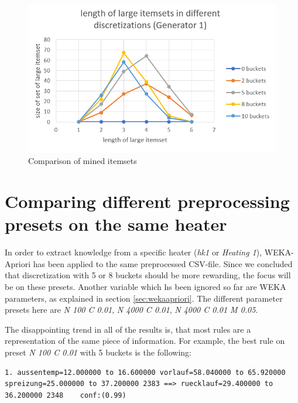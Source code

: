 \documentclass[bachelor,english]{info1thesis}
\begin{document}
\begin{figure}[htb]
	\begin{center}
		\includegraphics[scale=0.65]{abbildungen/itemsetssize.PNG}
		\caption{Comparison of mined itemsets}
			\label{fig:itemsetsizes}
	\end{center}
\end{figure}

\section{Comparing different preprocessing presets on the same heater}
\label{sec:sameheater}
In order to extract knowledge from a specific heater (\textit{hk1} or \textit{Heating 1}), WEKA-Apriori has been applied to the same preprocessed CSV-file. Since we concluded that discretization with 5 or 8 buckets should be more rewarding, the focus will be on these presets. Another variable which hs been ignored so far are WEKA parameters, as explained in section \ref{sec:wekaapriori}. The different parameter presets here are \textit{N 100 C 0.01}, \textit{N 4000 C 0.01}, \textit{N 4000 C 0.01 M 0.05}.

The disappointing trend in all of the results is, that most rules are a representation of the same piece of information. For example, the best rule on preset \textit{N 100 C 0.01} with 5 buckets is the following:

\begin{lstlisting}[style=arff, caption=best rule from N 100 C 0.01 - 5 buckets]
1. aussentemp=12.000000 to 16.600000 vorlauf=58.040000 to 65.920000 spreizung=25.000000 to 37.200000 2383 ==> ruecklauf=29.400000 to 36.200000 2348    conf:(0.99)
\end{lstlisting}
\end{document}
